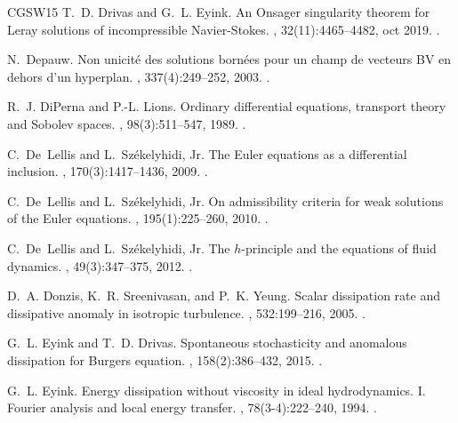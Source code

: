 \documentclass[12pt]{report}   %
\numberwithin{equation}{section}
\theoremstyle{plain}
\theoremstyle{definition}
\theoremstyle{remark}
\begin{document}
\begin{thebibliography}{CGSW15}
T.~D. Drivas and G.~L. Eyink.
\newblock An {O}nsager singularity theorem for {L}eray solutions of
  incompressible {N}avier-{S}tokes.
, 32(11):4465--4482, oct 2019.
\newblock {}.

N.~Depauw.
\newblock Non unicit\'{e} des solutions born\'{e}es pour un champ de vecteurs
  {BV} en dehors d'un hyperplan.
, 337(4):249--252, 2003.
\newblock {}.

R.~J. DiPerna and P.-L. Lions.
\newblock Ordinary differential equations, transport theory and {S}obolev
  spaces.
, 98(3):511--547, 1989.
\newblock {}.

C.~De~Lellis and L.~Sz\'{e}kelyhidi, Jr.
\newblock The {E}uler equations as a differential inclusion.
, 170(3):1417--1436, 2009.
\newblock {}.

C.~De~Lellis and L.~Sz{\'e}kelyhidi, Jr.
\newblock On admissibility criteria for weak solutions of the {E}uler
  equations.
, 195(1):225--260, 2010.
\newblock {}.

C.~De~Lellis and L.~Sz\'{e}kelyhidi, Jr.
\newblock The {$h$}-principle and the equations of fluid dynamics.
, 49(3):347--375, 2012.
\newblock {}.

D.~A. Donzis, K.~R. Sreenivasan, and P.~K. Yeung.
\newblock Scalar dissipation rate and dissipative anomaly in isotropic
  turbulence.
, 532:199–216, 2005.
\newblock {}.

G.~L. Eyink and T.~D. Drivas.
\newblock Spontaneous stochasticity and anomalous dissipation for {B}urgers
  equation.
, 158(2):386--432, 2015.
\newblock {}.

G.~L. Eyink.
\newblock Energy dissipation without viscosity in ideal hydrodynamics. {I}.
  {F}ourier analysis and local energy transfer.
, 78(3-4):222--240, 1994.
\newblock {}.


\end{thebibliography}
\end{document}
